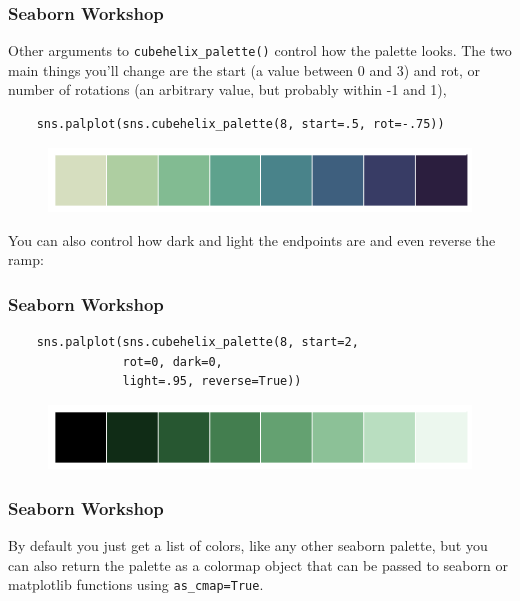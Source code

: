 \documentclass{beamer}
\begin{document}
\begin{frame}[fragile]
	\frametitle{Seaborn Workshop}
	\large
	
	Other arguments to \texttt{cubehelix\_palette()} control how the palette looks. The two main things you’ll change are the start (a value between 0 and 3) and rot, or number of rotations (an arbitrary value, but probably within -1 and 1),
	\begin{verbatim}
	sns.palplot(sns.cubehelix_palette(8, start=.5, rot=-.75))
	\end{verbatim}
	
	\begin{figure}
		\centering
		\includegraphics[width=0.7\linewidth]{images/color_palettes_36_0}
	\end{figure}
	
	You can also control how dark and light the endpoints are and even reverse the ramp:
\end{frame}
\begin{frame}[fragile]
	\frametitle{Seaborn Workshop}
	\Large
\vspace{-1cm}
	\begin{verbatim}
	sns.palplot(sns.cubehelix_palette(8, start=2, 
	            rot=0, dark=0,     
	            light=.95, reverse=True))
	\end{verbatim}
	
	\begin{figure}
		\centering
		\includegraphics[width=0.7\linewidth]{images/color_palettes_38_0}
	\end{figure}
	
	
\end{frame}
\begin{frame}[fragile]
	\frametitle{Seaborn Workshop}
	\large
	By default you just get a list of colors, like any other seaborn palette, but you can also return the palette as a colormap object that can be passed to seaborn or matplotlib functions using \texttt{as\_cmap=True}.
	
\end{frame}
\end{document}
